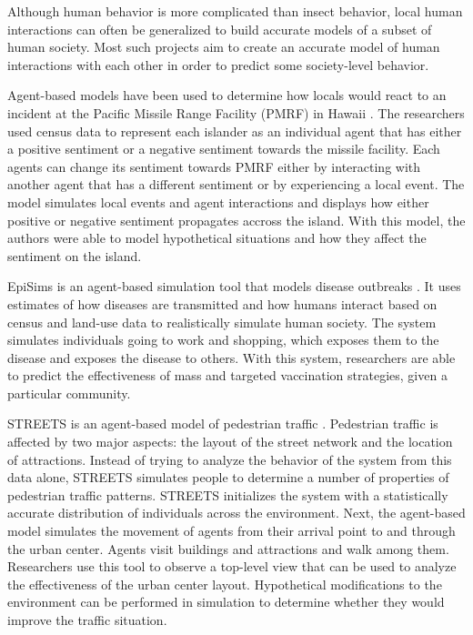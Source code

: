 Although human behavior is more complicated than insect behavior, local human interactions can often be generalized to build accurate models of a subset of human society.
Most such projects aim to create an accurate model of human interactions with each other in order to predict some society-level behavior.

Agent-based models have been used to determine how locals would react to an incident at the Pacific Missile Range Facility (PMRF) in Hawaii \cite{zanbaka}.
The researchers used census data to represent each islander as an individual agent that has either a positive sentiment or a negative sentiment towards the missile facility.
Each agents can change its sentiment towards PMRF either by interacting with another agent that has a different sentiment or by experiencing a local event.
The model simulates local events and agent interactions and displays how either positive or negative sentiment propagates accross the island.
With this model, the authors were able to model hypothetical situations and how they affect the sentiment on the island.

EpiSims is an agent-based simulation tool that models disease outbreaks \cite{eubank2004modelling}.
It uses estimates of how diseases are transmitted and how humans interact based on census and land-use data to realistically simulate human society.
The system simulates individuals going to work and shopping, which exposes them to the disease and exposes the disease to others.
With this system, researchers are able to predict the effectiveness of mass and targeted vaccination strategies, given a particular community.

STREETS is an agent-based model of pedestrian traffic \cite{schelhorn1999streets}.
Pedestrian traffic is affected by two major aspects: the layout of the street network and the location of attractions.
Instead of trying to analyze the behavior of the system from this data alone, STREETS simulates people to determine a number of properties of pedestrian traffic patterns.
STREETS initializes the system with a statistically accurate distribution of individuals across the environment.
Next, the agent-based model simulates the movement of agents from their arrival point to and through the urban center.
Agents visit buildings and attractions and walk among them.
Researchers use this tool to observe a top-level view that can be used to analyze the effectiveness of the urban center layout.
Hypothetical modifications to the environment can be performed in simulation to determine whether they would improve the traffic situation.

